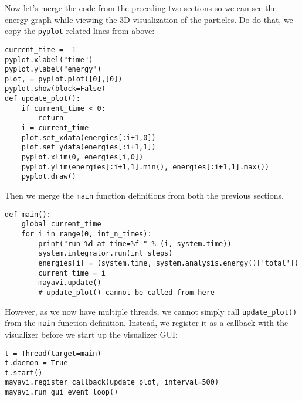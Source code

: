 \documentclass[
paper=a4,                       %
fontsize=11pt,                  %
twoside,                        %
footsepline,                    %
headsepline,                    %
headinclude=false,              %
footinclude=false,              %
pagesize,                       %
]{scrartcl}
\begin{document}
Now let's merge the code from the preceding two sections so we can see the energy graph while viewing the 3D visualization of the particles.
Do do that, we copy the \lstinline{pyplot}-related lines from above:
\begin{lstlisting}
current_time = -1
pyplot.xlabel("time")
pyplot.ylabel("energy")
plot, = pyplot.plot([0],[0])
pyplot.show(block=False)
def update_plot():
    if current_time < 0:
        return
    i = current_time
    plot.set_xdata(energies[:i+1,0])
    plot.set_ydata(energies[:i+1,1])
    pyplot.xlim(0, energies[i,0])
    pyplot.ylim(energies[:i+1,1].min(), energies[:i+1,1].max())
    pyplot.draw()
\end{lstlisting}
Then we merge the \lstinline{main} function definitions from both the previous sections.
\begin{lstlisting}
def main():
    global current_time
    for i in range(0, int_n_times):
        print("run %d at time=%f " % (i, system.time))
        system.integrator.run(int_steps)
        energies[i] = (system.time, system.analysis.energy()['total'])
        current_time = i
        mayavi.update()
        # update_plot() cannot be called from here
\end{lstlisting}
However, as we now have multiple threads, we cannot simply call \lstinline{update_plot()} from the \lstinline{main} function definition.
Instead, we register it as a callback with the visualizer before we start up the visualizer GUI:
\begin{lstlisting}
t = Thread(target=main)
t.daemon = True
t.start()
mayavi.register_callback(update_plot, interval=500)
mayavi.run_gui_event_loop()
\end{lstlisting}
\end{document}
